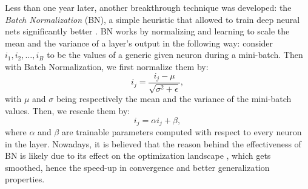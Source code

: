 \documentclass[LaM,binding=0.6cm]{./packages/sapthesis/sapthesis}
\begin{document}
        Less than one year later, another breakthrough technique was developed: the \textit{Batch Normalization} (BN), a simple heuristic that 
        allowed to train deep neural nets significantly better  \cite{batchn}. BN works by normalizing and learning to scale the mean and the variance of a layer's output
        in the following way: consider $i_1, i_2, \ldots, i_B$ to be the values of a generic given neuron during a mini-batch. Then with Batch Normalization,
        we first normalize them by:
        \begin{equation}
            i_j = \frac{i_j - \mu}{\sqrt{\sigma^2 + \epsilon}},
        \end{equation}
        with $\mu$ and $\sigma$ being respectively the mean and the variance of the mini-batch values. Then,
        we rescale them by:
        \begin{equation}
            i_j = \alpha i_j + \beta,
        \end{equation}
        where $\alpha$ and $\beta$ are trainable parameters computed with respect to every neuron in the layer.
        Nowadays, it is believed that the reason behind the effectiveness of BN is likely due to its effect on the 
        optimization landscape \cite{bn2}, which gets smoothed, hence the speed-up in convergence and better
        generalization properties.
\end{document}
